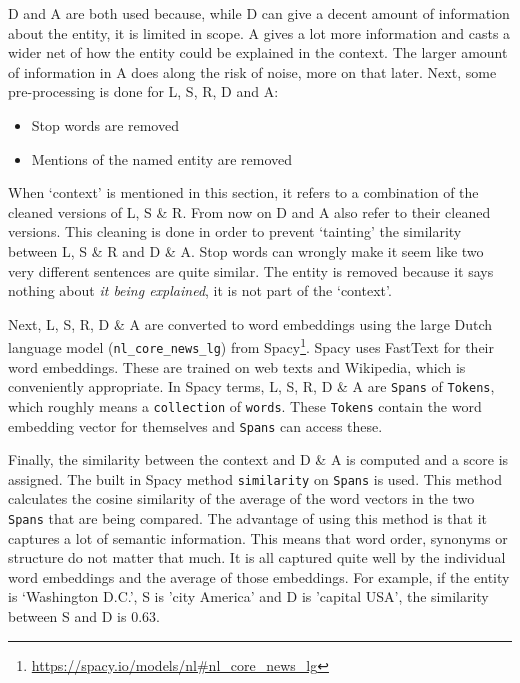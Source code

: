 \documentclass[
10pt, %
a4paper, %
oneside, %
headinclude,footinclude, %
] {book}%
\begin{document}
D and A are both used because, while D can give a decent amount of information about the entity, it is limited in scope.
A gives a lot more information and casts a wider net of how the entity could be explained in the context.
The larger amount of information in A does along the risk of noise, more on that later.
Next, some pre-processing is done for L, S, R, D and A:

\begin{itemize}
  \item Stop words are removed
  \item Mentions of the named entity are removed
\end{itemize}

When `context' is mentioned in this section, it refers to a combination of the cleaned versions of L, S \& R.
From now on D and A also refer to their cleaned versions.
This cleaning is done in order to prevent `tainting' the similarity between L, S \& R and D \& A.
Stop words can wrongly make it seem like two very different sentences are quite similar.
The entity is removed because it says nothing about \textit{it being explained}, it is not part of the `context'.

Next, L, S, R, D \& A are converted to word embeddings using the large Dutch language model (\verb+nl_core_news_lg+) from Spacy\footnote{\url{https://spacy.io/models/nl\#nl_core_news_lg}}.
Spacy uses FastText \citep{bojanowski2016} for their word embeddings.
These are trained on web texts and Wikipedia, which is conveniently appropriate.
In Spacy terms, L, S, R, D \& A are \verb+Spans+ of \verb+Tokens+, which roughly means a \verb+collection+ of \verb+words+.
These \verb+Tokens+ contain the word embedding vector for themselves and \verb+Spans+ can access these.

Finally, the similarity between the context and D \& A is computed and a score is assigned.
The built in Spacy method \verb+similarity+ on \verb+Spans+ is used.
This method calculates the cosine similarity of the average of the word vectors in the two \verb+Spans+ that are being compared.
The advantage of using this method is that it captures a lot of semantic information.
This means that word order, synonyms or structure do not matter that much.
It is all captured quite well by the individual word embeddings and the average of those embeddings.
For example, if the entity is `Washington D.C.', S is 'city America' and D is 'capital USA', the similarity between S and D is 0.63.
\end{document}

